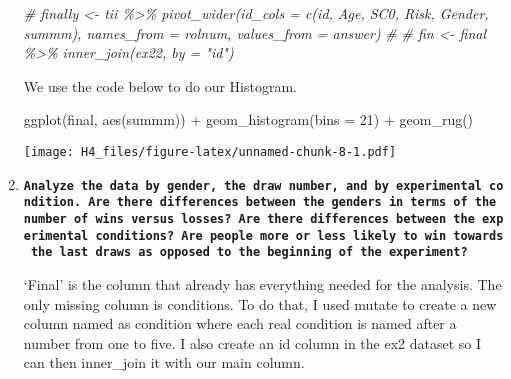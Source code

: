 \documentclass[
]{article}
\newenvironment{Shaded}{\begin{snugshade}}{\end{snugshade}}
\newcommand{\AttributeTok}[1]{\textcolor[rgb]{0.77,0.63,0.00}{#1}}
\newcommand{\CommentTok}[1]{\textcolor[rgb]{0.56,0.35,0.01}{\textit{#1}}}
\newcommand{\DecValTok}[1]{\textcolor[rgb]{0.00,0.00,0.81}{#1}}
\newcommand{\FunctionTok}[1]{\textcolor[rgb]{0.00,0.00,0.00}{#1}}
\newcommand{\NormalTok}[1]{#1}
\newcommand{\SpecialCharTok}[1]{\textcolor[rgb]{0.00,0.00,0.00}{#1}}
\begin{document}
\begin{enumerate}
\begin{Shaded}
\begin{Highlighting}[]
\CommentTok{\# finally \textless{}{-} tii \%\textgreater{}\%  pivot\_wider(id\_cols = c(id, Age, SC0, Risk, Gender, summm), names\_from = rolnum, values\_from = answer)}
\CommentTok{\# }
\CommentTok{\#   fin \textless{}{-} final \%\textgreater{}\% inner\_join(ex22, by = "id")}
\end{Highlighting}
\end{Shaded}

  We use the code below to do our Histogram.

\begin{Shaded}
\begin{Highlighting}[]
\FunctionTok{ggplot}\NormalTok{(final, }\FunctionTok{aes}\NormalTok{(summm)) }\SpecialCharTok{+} \FunctionTok{geom\_histogram}\NormalTok{(}\AttributeTok{bins =} \DecValTok{21}\NormalTok{) }\SpecialCharTok{+} \FunctionTok{geom\_rug}\NormalTok{()}
\end{Highlighting}
\end{Shaded}

  \texttt{[image: H4\_files/figure-latex/unnamed-chunk-8-1.pdf]}
\item
  \textbf{\texttt{Analyze\ the\ data\ by\ gender,\ the\ draw\ number,\ and\ by\ experimental\ condition.\ Are\ there\ differences\ between\ the\ genders\ in\ terms\ of\ the\ number\ of\ wins\ versus\ losses?\ Are\ there\ differences\ between\ the\ experimental\ conditions?\ Are\ people\ more\ or\ less\ likely\ to\ win\ towards\ the\ last\ draws\ as\ opposed\ to\ the\ beginning\ of\ the\ experiment?}}

  `Final' is the column that already has everything needed for the
  analysis. The only missing column is conditions. To do that, I used
  mutate to create a new column named as condition where each real
  condition is named after a number from one to five. I also create an
  id column in the ex2 dataset so I can then inner\_join it with our
  main column.


\end{enumerate}
\end{document}
